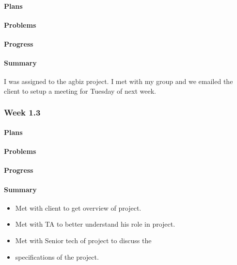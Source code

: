 \documentclass[onecolumn, draftclsnofoot,10pt, compsoc]{article}
\begin{document}
		    \paragraph{Plans} \hfill \break
		        
		    \paragraph{Problems} \hfill \break
		
		    \paragraph{Progress} \hfill \break
		    
		    \paragraph{Summary} \hfill \break
		        I was assigned to the agbiz project. I met with my group and we emailed the client to setup a meeting for Tuesday of next week. 
		    \\ 
		        
		\subsubsection{Week 1.3}
		
		    \paragraph{Plans} \hfill \break

		    \paragraph{Problems} \hfill \break

		    \paragraph{Progress} \hfill \break
		    
		    \paragraph{Summary} \hfill \break
		    	\begin{itemize}
		        \item Met with client to get overview of project.
                \item Met with TA to better understand his role in project.
                \item Met with Senior tech of project to discuss the \item specifications of the project.
                \end{itemize}
\end{document}
